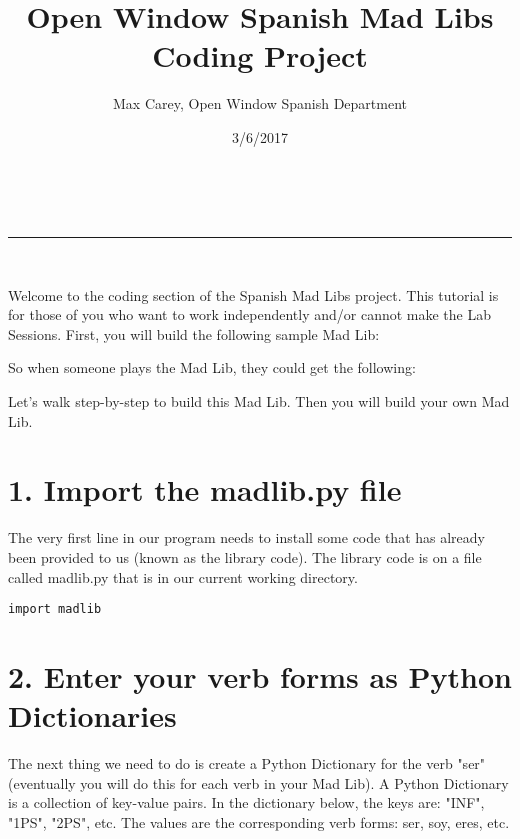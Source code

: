 \documentclass[a4paper,11pt]{article}
\makeatletter
\newcommand{\linia}{\rule{\linewidth}{0.5pt}}
\theoremstyle{mytheor}
\renewcommand{\maketitle}{
\begin{center}
\vspace{2ex}
{\huge \textsc{\@title}}
\vspace{1ex}
\\
\linia\\
\@author \hfill \@date
\vspace{4ex}
\end{center}
}
\makeatother
\begin{document}
\title{Open Window Spanish Mad Libs Coding Project}
\author{Max Carey, Open Window Spanish Department}
\date{3/6/2017}
\maketitle
Welcome to the coding section of the Spanish Mad Libs project. 
This tutorial is for those of you who want to work independently and/or cannot make the Lab Sessions. 
First, you will build the following sample Mad Lib:
\newline

\noindent{}%
\newline
\newline
So when someone plays the Mad Lib, they could get the following:

\noindent{}
\newline
\newline
Let's walk step-by-step to build this Mad Lib. Then you will build your own Mad Lib.

\section*{1. Import the madlib.py file}

The very first line in our program needs to install some code that has already been provided to us (known as the library code). The library code is on a file called madlib.py that is in our current working directory.
\begin{lstlisting}[label={list:second},caption=Put this at the top of your program:]
import madlib
\end{lstlisting}


\section*{2. Enter your verb forms as Python Dictionaries}

The next thing we need to do is create a Python Dictionary for the verb "ser" (eventually you will do this for each verb in your Mad Lib). A Python Dictionary is a collection of key-value pairs. In the dictionary below, the keys are: "INF", "1PS", "2PS", etc. The values are the corresponding verb forms: ser, soy, eres, etc.
\end{document}
